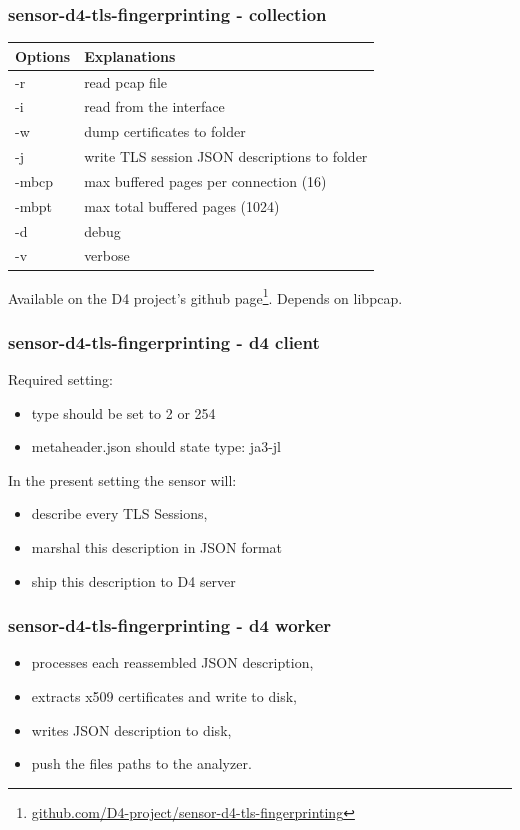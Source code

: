 \documentclass{beamer}
\begin{document}
\begin{frame}
        \frametitle{sensor-d4-tls-fingerprinting - collection}

  


\begin{tabular}{l|l}
Options & Explanations\\
\hline
  -r & read pcap file\\
  -i & read from the interface \\
  -w & dump certificates to folder\\
  -j & write TLS session JSON descriptions to folder\\
  -mbcp & max buffered pages per connection (16) \\
  -mbpt & max total buffered pages (1024) \\
  -d & debug \\
  -v & verbose
\end{tabular}

\vspace{.8cm}
Available on the D4 project's github page\footnote{\url{github.com/D4-project/sensor-d4-tls-fingerprinting}}.
Depends on libpcap.

\end{frame}


\begin{frame}[fragile]
        \frametitle{sensor-d4-tls-fingerprinting - d4 client} 
        Required setting:
        \begin{itemize}
        \item type should be set to 2 or 254
          \item metaheader.json should state type: ja3-jl
        \end{itemize}
        
        \vspace{.5cm}
        
        In the present setting the sensor will:
        \begin{itemize}
          \item describe every TLS Sessions,
          \item marshal this description in JSON format
          \item ship this description to D4 server
        \end{itemize}
\end{frame}

\begin{frame}[fragile]
        \frametitle{sensor-d4-tls-fingerprinting - d4 worker} 
        
        \begin{itemize}
          \item processes each reassembled JSON description,
          \item extracts x509 certificates and write to disk,
          \item writes JSON description to disk,
          \item push the files paths to the analyzer.
        \end{itemize}
\end{frame}
\end{document}
